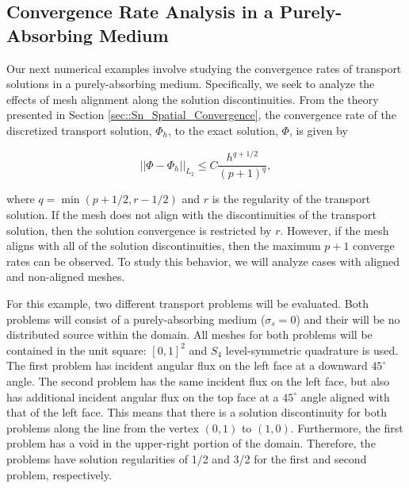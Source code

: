 



\subsection{Convergence Rate Analysis in a Purely-Absorbing Medium}
\label{sec::BF_Results_PA}

Our next numerical examples involve studying the convergence rates of transport solutions in a purely-absorbing medium. Specifically, we seek to analyze the effects of mesh alignment along the solution discontinuities. From the theory presented in Section \ref{sec::Sn_Spatial_Convergence}, the convergence rate of the discretized transport solution, $\Phi_h$, to the exact solution, $\Phi$, is given by

\begin{equation}
\label{eq::BF_results_PA_conv}
|| \Phi - \Phi_{h} ||_{L_2}\leq C \frac{h^{q+1/2}}{(p+1)^q} ,
\end{equation}

\noindent where $q = \min (p+1/2, r - 1/2)$ and $r$ is the regularity of the transport solution. If the mesh does not align with the discontinuities of the transport solution, then the solution convergence is restricted by $r$. However, if the mesh aligns with all of the solution discontinuities, then the maximum $p+1$ converge rates can be observed. To study this behavior, we will analyze cases with aligned and non-aligned meshes.

For this example, two different transport problems will be evaluated. Both problems will consist of a purely-absorbing medium ($\sigma_s=0$) and their will be no distributed source within the domain. All meshes for both problems will be contained in the unit square: $[0,1]^2$ and $S_4$ level-symmetric quadrature is used. The first problem has incident angular flux on the left face at a downward $45^{\circ}$ angle. The second problem has the same incident flux on the left face, but also has additional incident angular flux on the top face at a $45^{\circ}$ angle aligned with that of the left face. This means that there is a solution discontinuity for both problems along the line from the vertex $(0,1)$ to $(1,0)$. Furthermore, the first problem has a void in the upper-right portion of the domain. Therefore, the problems have solution regularities of 1/2 and 3/2 for the first and second problem, respectively.

